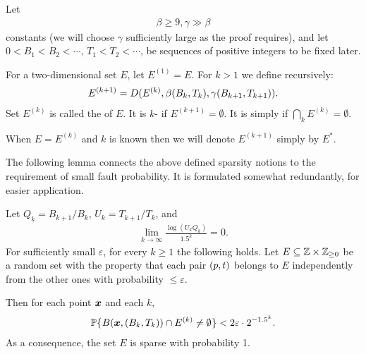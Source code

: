 \documentclass[12pt]{memoir}
\renewcommand{\le}{\leq}
\renewcommand{\ge}{\geq}
\def\B{B}
\def\U{U}
\newcommand{\Tu}{T}
\begin{document}
\begin{definition}[Sparsity]\label{def:sparsity}
Let
\begin{align}\label{eq:beta}
 \beta\ge 9, \gamma\gg\beta
 \end{align}
constants (we will choose \( \gamma \) sufficiently large as the proof requires), and let 
\( 0<\B_{1}<\B_{2}<\dotsm \), \( \Tu_{1}<\Tu_{2}<\dotsm \), 
be sequences of positive integers to be fixed later.

For a two-dimensional set \( E \), let \( E^{(1)} = E \).
For \( k>1 \) we define recursively:
\begin{align}\label{eq:noise^k}
    E^{(k+1)} = D(E^{(k)}, \beta\pair{\B_k}{\Tu_{k}}, \gamma\pair{\B_{k+1}}{\Tu_{k+1}}).
\end{align}
Set \( E^{(k)} \) is called the  of \( E \).
It is \( k \)- if \( E^{(k+1)}=\emptyset \).
It is simply  if \( \bigcap_{k}E^{(k)}=\emptyset \).

When \( E=E^{(k)} \) and \( k \) is known
then we will denote \( E^{(k+1)} \) simply by \( E^{*} \).
\end{definition}


The following lemma connects the above defined sparsity notions to the requirement
of small fault probability.
It is formulated somewhat redundantly, for easier application.

\begin{lemma}[Sparsity]\label{lem:sparsiness}
Let \( Q_k = \B_{k+1}/\B_{k} \), \( \U_k = \Tu_{k+1}/\Tu_{k} \), and
\begin{align}\label{eq:assumption}
  \lim_{k\rightarrow\infty}\frac{\log(\U_{k} Q_k)}{1.5^k}=0.
\end{align}
For sufficiently small \( \varepsilon \), for every \( k\ge 1 \) the following holds.
Let \( E\subseteq \bbZ\times \bbZ_{\ge 0} \)
be a random set with the property that each pair \( (p,t) \) belongs to \( E \)
independently from the other ones with probability \( \le \varepsilon \).

Then for each point \( \boldsymbol{x} \)  and each \( k \),
 \begin{align*}
   \Pbof{B(\vek{x},(\B_k, \Tu_{k}))\cap E^{(k)}\neq\emptyset} <2\varepsilon \cdot 2^{-1.5^{k}}.
 \end{align*}
As a consequence, the set \( E \) is sparse with probability 1.
\end{lemma}
\end{document}
